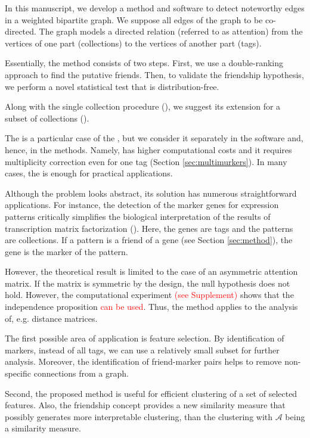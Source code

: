 \documentclass{llncs}
\begin{document}
In this manuscript, we develop a method and software to detect noteworthy edges in a weighted bipartite graph. We suppose all edges of the graph to be co-directed. The graph models a directed relation (referred to as attention) from the vertices of one part (collections) to the vertices of another part (tags).

Essentially, the method consists of two steps. First, we use a double-ranking approach to find the putative friends. Then, to validate the friendship hypothesis, we perform a novel statistical test that is distribution-free.

Along with the single collection procedure (), we suggest its extension for a subset of collections ().

The  is a particular case of the , but we consider it separately in the software and, hence, in the methods. Namely,  has higher computational costs and it requires multiplicity correction even for one tag (Section \ref{sec:multimurkers}). In many cases, the  is enough for practical applications. 

Although the problem looks abstract, its solution has numerous straightforward applications. For instance, the detection of the marker genes \cite{stein-obrien_patternmarkers_2017} for expression patterns critically simplifies the biological interpretation of the results of transcription matrix factorization (\cite{Stein_2018,Fertig_2016}). Here, the genes are tags and the patterns are collections. If a pattern is a friend of a gene (see Section \ref{sec:method}), the gene is the marker of the pattern.

However, the theoretical result is limited to the case of an asymmetric attention matrix. If the matrix is symmetric by the design, the null hypothesis does not hold. However, the computational experiment \textcolor{red}{(see Supplement)} shows that the independence proposition \textcolor{red}{can be used}. Thus, the method applies to the analysis of, e.g. distance matrices. 

The first possible area of application is feature selection. By identification of markers, instead of all tags, we can use a relatively small subset for further analysis. Moreover, the identification of friend-marker pairs helps to remove non-specific connections from a graph. 

Second, the proposed method is useful for efficient clustering of a set of selected features. Also, the friendship concept provides a new similarity measure that possibly generates more interpretable clustering, than the clustering with $\mathcal{A}$ being a similarity measure.
\end{document}
